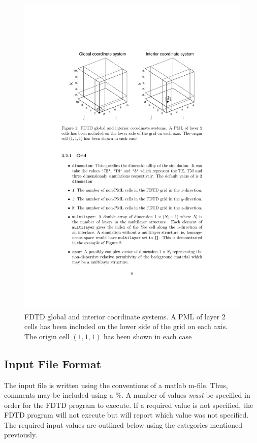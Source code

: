 \documentclass[a4paper, 12pt]{article}
\begin{document}
	\begin{figure}[h]
		\begin{center}
			\includegraphics[width=\textwidth]{figures/0.pdf}
			\caption{FDTD global and interior coordinate systems. A PML of layer 2
				cells has been included on the lower side of the grid on each
				axis. The origin cell $(1,1,1)$ has been shown in each case}
			\label{fig:coords}
		\end{center}
	\end{figure}


	\subsection{Input File Format}
	The input file is written using the conventions of a matlab
	m-file. Thus, comments may be included using a \%. A number of values
	\emph{must} be specified in order for the FDTD program to execute. If a
	required value is not specified, the FDTD program will not execute but
	will report which value was not specified. The required input values
	are outlined below using the categories mentioned previously.
\end{document}
